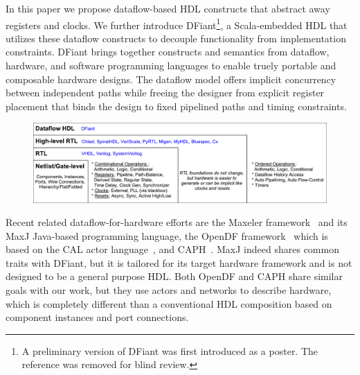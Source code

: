 In this paper we propose dataflow-based HDL constructs that abstract away registers and clocks. We further introduce DFiant\footnote{A preliminary version of DFiant was first introduced as a poster. The reference was removed for blind review.}, a Scala-embedded HDL that utilizes these dataflow constructs to decouple functionality from implementation constraints. DFiant brings together constructs and semantics from dataflow\cite{le1986signal, Thuau1991, gurd1985manchester, arvind1992id}, hardware, and software programming languages to enable truely portable and composable hardware designs. The dataflow model offers implicit concurrency between independent paths while freeing the designer from explicit register placement that binds the design to fixed pipelined paths and timing constraints.  

\begin{figure}[t]
	\centering
	\captionsetup{justification=centering}
	\includegraphics[width=\linewidth]{graphics/motivation.pdf} 
	\label{fig:motivation}
\end{figure}

Recent related dataflow-for-hardware efforts are the Maxeler framework~\cite{Pell2011} and its MaxJ Java-based programming language, the OpenDF framework~\cite{bhattacharyya2008opendf} which is based on the CAL actor language~\cite{eker2003cal}, and CAPH~\cite{serot2011implementing}. MaxJ indeed shares common traits with DFiant, but it is tailored for its target hardware framework and is not designed to be a general purpose HDL. Both OpenDF and CAPH share similar goals with our work, but they use actors and networks to describe hardware, which is completely different than a conventional HDL composition based on component instances and port connections.

